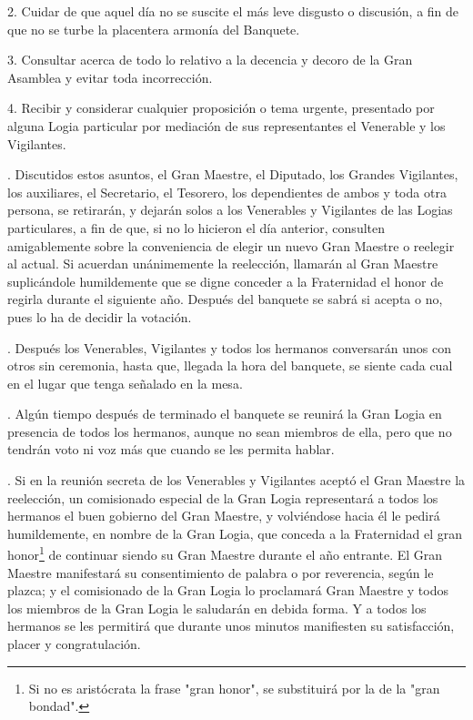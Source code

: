 \documentclass[a4paper,12pt,twoside]{book}
\begin{document}
2. Cuidar de que aquel día no se suscite el más leve disgusto o discusión, a fin de que no se turbe la placentera armonía del Banquete.

3. Consultar acerca de todo lo relativo a la decencia y decoro de la Gran Asamblea y evitar toda incorrección.

4. Recibir y considerar cualquier proposición o tema urgente, presentado por alguna Logia particular por mediación de sus representantes el Venerable y los Vigilantes.

\vspace{0.3cm}

. Discutidos estos asuntos, el Gran Maestre, el Diputado, los Grandes Vigilantes, los auxiliares, el Secretario, el Tesorero, los dependientes de ambos y toda otra persona, se retirarán, y dejarán solos a los Venerables y Vigilantes de las Logias particulares, a fin de que, si no lo hicieron el día anterior, consulten amigablemente sobre la conveniencia de elegir un nuevo Gran Maestre o reelegir al actual. Si acuerdan unánimemente la reelección, llamarán al Gran Maestre suplicándole humildemente que se digne conceder a la Fraternidad el honor de regirla durante el siguiente año. Después del banquete se sabrá si acepta o no, pues lo ha de decidir la votación.

\vspace{0.3cm}

. Después los Venerables, Vigilantes y todos los hermanos conversarán unos con otros sin ceremonia, hasta que, llegada la hora del banquete, se siente cada cual en el lugar que tenga señalado en la mesa.

\vspace{0.3cm}

. Algún tiempo después de terminado el banquete se reunirá la Gran Logia en presencia de todos los hermanos, aunque no sean miembros de ella, pero que no tendrán voto ni voz más que cuando se les permita hablar.

\vspace{0.3cm}

. Si en la reunión secreta de los Venerables y Vigilantes aceptó el Gran Maestre la reelección, un comisionado especial de la Gran Logia representará a todos los hermanos el buen gobierno del Gran Maestre, y volviéndose hacia él le pedirá humildemente, en nombre de la Gran Logia, que conceda a la Fraternidad el gran honor\footnote{Si no es aristócrata la frase "gran honor", se substituirá por la de la "gran bondad".} de continuar siendo su Gran Maestre durante el año entrante. El Gran Maestre manifestará su consentimiento de palabra o por reverencia, según le plazca; y el comisionado de la Gran Logia lo proclamará Gran Maestre y todos los miembros de la Gran Logia le saludarán en debida forma. Y a todos los hermanos se les permitirá que durante unos minutos manifiesten su satisfacción, placer y congratulación.
\end{document}
